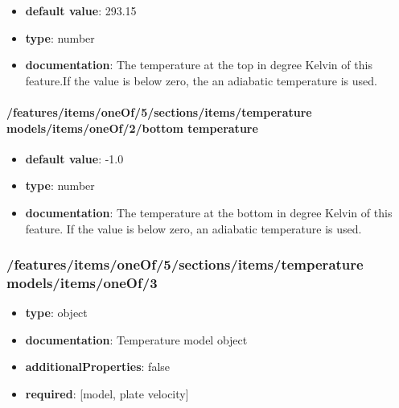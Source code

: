 \begin{itemize}\item {\bf default value}: 293.15
\item {\bf type}: number
\item {\bf documentation}: The temperature at the top in degree Kelvin of this feature.If the value is below zero, the an adiabatic temperature is used.
\end{itemize}\paragraph{/features/items/oneOf/5/sections/items/temperature models/items/oneOf/2/bottom temperature}
\begin{itemize}\item {\bf default value}: -1.0
\item {\bf type}: number
\item {\bf documentation}: The temperature at the bottom in degree Kelvin of this feature. If the value is below zero, an adiabatic temperature is used.
\end{itemize}\subsubsection{/features/items/oneOf/5/sections/items/temperature models/items/oneOf/3}
\begin{itemize}\item {\bf type}: object
\item {\bf documentation}: Temperature model object
\item {\bf additionalProperties}: false
\item {\bf required}: [model, plate velocity]\end{itemize}
